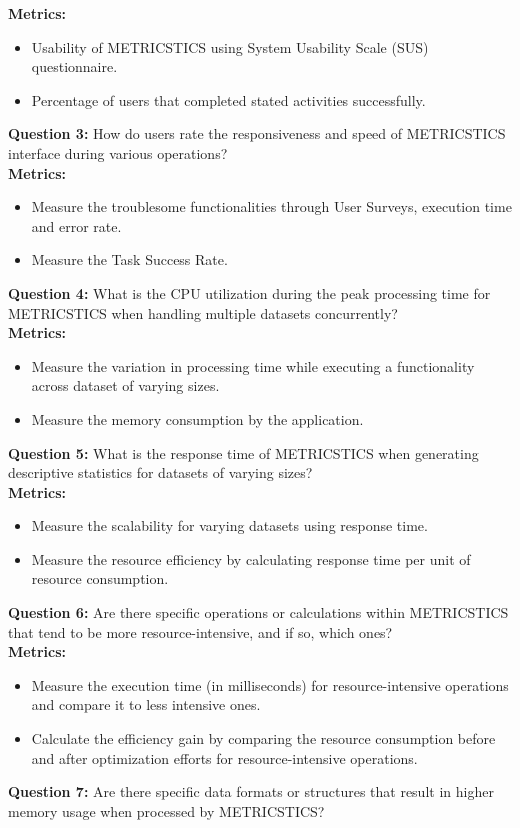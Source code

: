 \textbf{Metrics:}
\begin{itemize}
    \item Usability of METRICSTICS using System Usability Scale (SUS) questionnaire.
    \item Percentage of users that completed stated activities successfully. 
\end{itemize}
\vspace{10pt}
\textbf{Question 3:} How do users rate the responsiveness and speed of METRICSTICS interface during various operations? \\

\textbf{Metrics:}
\begin{itemize}
    \item Measure the troublesome functionalities through User Surveys, execution time and error rate.
    \item Measure the Task Success Rate.
\end{itemize}
\vspace{10pt}
\textbf{Question 4:} What is the CPU utilization during the peak processing time for METRICSTICS when handling multiple datasets concurrently?
 \\
 \textbf{Metrics:}
\begin{itemize}
    \item Measure the variation in processing time while executing a functionality across dataset of varying sizes.
    \item Measure the memory consumption by the application.
\end{itemize}
\vspace{10pt}
\textbf{Question 5:} What is the response time of METRICSTICS when generating descriptive statistics for datasets of varying sizes? \\

\textbf{Metrics:}
\begin{itemize}
    \item Measure the scalability for varying datasets using response time. 

    \item  Measure the resource efficiency by calculating response time per unit of resource consumption.
\end{itemize}
\vspace{10pt}
\textbf{Question 6:} Are there specific operations or calculations within METRICSTICS that tend to be more resource-intensive, and if so, which ones? 
 \\
 \textbf{Metrics:}
\begin{itemize}
    \item Measure the execution time (in milliseconds) for resource-intensive operations and compare it to less intensive ones.
    \item Calculate the efficiency gain by comparing the resource consumption before and after optimization efforts for resource-intensive operations.
\end{itemize}
\vspace{10pt}
\textbf{Question 7:} Are there specific data formats or structures that result in higher memory usage when processed by METRICSTICS? \\

